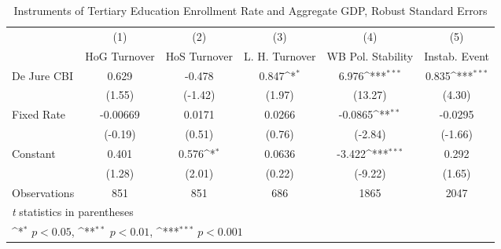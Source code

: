 \begin{table}[htbp]\centering
\def\sym#1{\ifmmode^{#1}\else\(^{#1}\)\fi}
\caption{Instruments of Tertiary Education Enrollment Rate and Aggregate GDP, Robust Standard Errors \label{ifivs}}
\begin{tabular}{l*{5}{c}}
\toprule
                                        &\multicolumn{1}{c}{(1)}&\multicolumn{1}{c}{(2)}&\multicolumn{1}{c}{(3)}&\multicolumn{1}{c}{(4)}&\multicolumn{1}{c}{(5)}\\
                                        &\multicolumn{1}{c}{HoG Turnover}&\multicolumn{1}{c}{HoS Turnover}&\multicolumn{1}{c}{L. H. Turnover}&\multicolumn{1}{c}{WB Pol. Stability}&\multicolumn{1}{c}{Instab. Event}\\
\midrule
De Jure CBI                             &    0.629         &   -0.478         &    0.847\sym{*}  &    6.976\sym{***}&    0.835\sym{***}\\
                                        &   (1.55)         &  (-1.42)         &   (1.97)         &  (13.27)         &   (4.30)         \\
\addlinespace
Fixed Rate                              & -0.00669         &   0.0171         &   0.0266         &  -0.0865\sym{**} &  -0.0295         \\
                                        &  (-0.19)         &   (0.51)         &   (0.76)         &  (-2.84)         &  (-1.66)         \\
\addlinespace
Constant                                &    0.401         &    0.576\sym{*}  &   0.0636         &   -3.422\sym{***}&    0.292         \\
                                        &   (1.28)         &   (2.01)         &   (0.22)         &  (-9.22)         &   (1.65)         \\
\midrule
Observations                            &      851         &      851         &      686         &     1865         &     2047         \\
\bottomrule
\multicolumn{6}{l}{\footnotesize \textit{t} statistics in parentheses}\\
\multicolumn{6}{l}{\footnotesize \sym{*} \(p<0.05\), \sym{**} \(p<0.01\), \sym{***} \(p<0.001\)}\\
\end{tabular}
\end{table}
